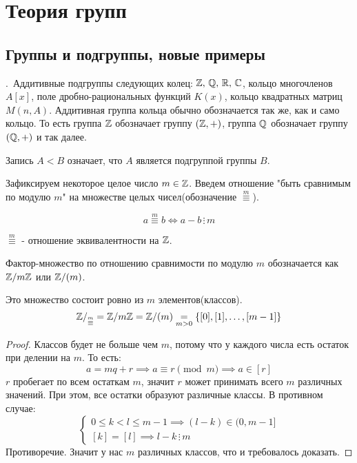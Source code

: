 \documentclass[../main.tex]{subfiles}
\begin{document}
\chapter{Теория групп}
\section{Группы и подгруппы, новые примеры}%


\textbf{}.\, Аддитивные подгруппы следующих колец: $\mathbb{Z},\, \mathbb{Q},\, \mathbb{R},\, \mathbb{C}$, кольцо многочленов $A[x]$, поле дробно-рациональных функций $K(x)$, кольцо квадратных матриц $M(n, A)$. Аддитивная группа кольца обычно обозначается так же, как и само кольцо. То есть группа $\mathbb{Z}$ обозначает группу $(\mathbb{Z}, +)$, группа $\mathbb{Q}$ обозначает группу $(\mathbb{Q}, +)$ и так далее.

\begin{remark}
    Запись $A < B$ означает, что $A$ является подгруппой группы $B$.
\end{remark}

 Зафиксируем некоторое целое число $m \in \mathbb{Z}$. Введем отношение "быть сравнимым по модулю $m$" на множестве целых чисел(обозначение $\overset{m}{\equiv}$).

\begin{equation*}
    a \overset{m}{\equiv} b \iff a - b \, \vdots \, m
\end{equation*}

\begin{statement}
    $\overset{m}{\equiv}$ - отношение эквивалентности на $\mathbb{Z}$.
\end{statement}

Фактор-множество по отношению сравнимости по модулю $m$ обозначается как $\mathbb{Z}/m\mathbb{Z}$ или $\mathbb{Z}/(m)$.

\begin{statement}
Это множество состоит ровно из $m$ элементов(классов).
\begin{equation*}
    \mathbb{Z}/_{\overset{m}{\equiv}} = \mathbb{Z}/m\mathbb{Z} = \mathbb{Z}/(m) \underset{m > 0}{=} \{[0], [1], \dotsc, [m - 1]\}
\end{equation*}
\end{statement}
\begin{proof}
    Классов будет не больше чем $m$, потому что у каждого числа есть остаток при делении на $m$. То есть:
    \begin{equation*}
        a = mq + r \implies a \equiv r \pmod m \implies a \in [r]
    \end{equation*}
    $r$ пробегает по всем остаткам $m$, значит $r$ может принимать всего $m$ различных значений. При этом, все остатки образуют различные классы. В противном случае:
    \begin{equation*}
        \begin{cases*}
            0 \leq k < l \leq m - 1 \implies (l - k) \in (0, m - 1] \\
            [k] = [l]  \implies l - k\, \vdots\, m
        \end{cases*}
    \end{equation*}
    Противоречие. Значит у нас $m$ различных классов, что и требовалось доказать.
\end{proof}
\end{document}
